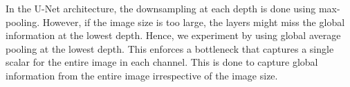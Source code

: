 In the U-Net architecture, the downsampling at each depth is done using max-pooling.
However, if the image size is too large, the layers might miss the global information at the lowest depth.
Hence, we experiment by using global average pooling at the lowest depth.
This enforces a bottleneck that captures a single scalar for the entire image in each channel.
This is done to capture global information from the entire image irrespective of the image size.
